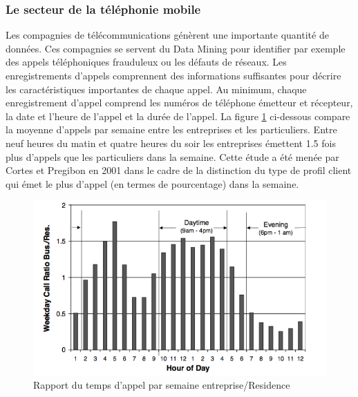 \documentclass[11pt,a4paper]{report}
\begin{document}
\newpage
 \subsubsection{Le secteur de la téléphonie mobile}
 Les compagnies de télécommunications génèrent une importante quantité de données. Ces compagnies se servent du Data Mining pour identifier par exemple des appels téléphoniques frauduleux ou les défauts de réseaux.
 Les enregistrements d'appels comprennent des informations suffisantes pour décrire les caractéristiques importantes de chaque appel. Au minimum, chaque enregistrement d'appel comprend les numéros de téléphone émetteur et récepteur, la date et l'heure de l'appel et la durée de l'appel.  La figure \ref{telephone} ci-dessous compare la moyenne d'appels par semaine entre les entreprises et les particuliers. Entre neuf heures du matin et quatre heures du soir les entreprises émettent 1.5 fois plus d'appels que les particuliers dans la semaine. Cette étude a été menée par Cortes et Pregibon en 2001 dans le cadre de la distinction du type de profil client qui émet le plus d'appel (en termes de pourcentage) dans la semaine. \cite{tekephone_secteur} 

%
%
%
 \begin{figure}[h]
   \centering
   \includegraphics[scale=0.5]{telephone.png}
      \caption{Rapport du temps d'appel par semaine entreprise/Residence}
      \label{telephone}
\end{figure}


%
%
\end{document}

